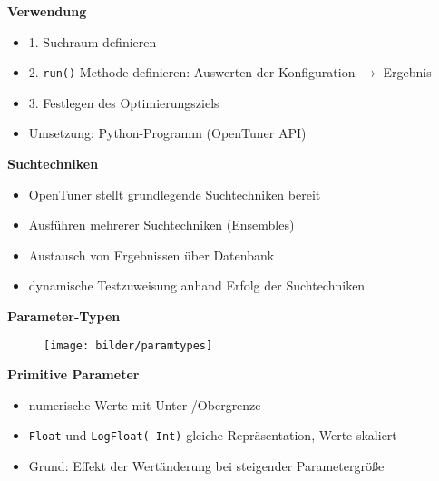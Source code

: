   \begingroup
  \begin{frame}
  \textbf{Verwendung}
  \begin{itemize}
    \item 1. Suchraum definieren 
    \item 2. \texttt{run()}-Methode definieren: Auswerten der Konfiguration $\rightarrow$ Ergebnis
    \item 3. Festlegen des Optimierungsziels
    \item Umsetzung: Python-Programm (OpenTuner API) \newline
    
  \end{itemize}
  \textbf{Suchtechniken}
  \begin{itemize}
    \item OpenTuner stellt grundlegende Suchtechniken bereit
    \item Ausführen mehrerer Suchtechniken (Ensembles)
    \item Austausch von Ergebnissen über Datenbank

    \item dynamische Testzuweisung anhand Erfolg der Suchtechniken

    
  \end{itemize}
  \end{frame}
  \endgroup
    
  \begingroup
  \begin{frame}
    \textbf{Parameter-Typen}
    \begin{figure}[ht]
      \centering	      
      \texttt{[image: bilder/paramtypes]}
      \label{paramtypes}
    \end{figure}
    
  \textbf{Primitive Parameter}
  \begin{itemize}
    \item numerische Werte mit Unter-/Obergrenze
    \item \texttt{Float} und \texttt{LogFloat(-Int)} gleiche Repräsentation, Werte skaliert
    \item Grund: Effekt der Wertänderung bei steigender Parametergröße
    
  \end{itemize}
  \end{frame}
  \endgroup
  
